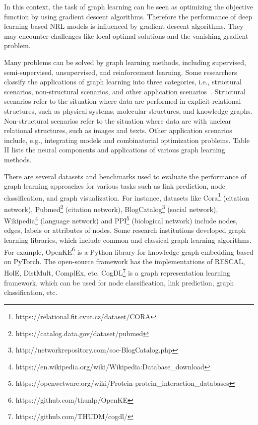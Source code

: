 In this context, the task of graph learning can be seen as optimizing the objective function by using gradient descent algorithms. Therefore the performance of deep learning based NRL models is influenced by gradient descent algorithms. They may encounter challenges like local optimal solutions and the vanishing gradient problem.

\label{sec:appication}
Many problems can be solved by graph learning methods, including supervised, semi-supervised, unsupervised, and reinforcement learning. Some researchers classify the applications of graph learning into three categories, i.e., structural scenarios, non-structural scenarios, and other application scenarios~. Structural scenarios refer to the situation where data are performed in explicit relational structures, such as physical systems, molecular structures, and knowledge graphs. Non-structural scenarios refer to the situation where data are with unclear relational structures, such as images and texts. Other application scenarios include, e.g., integrating models and combinatorial optimization problems. Table II lists the neural components and applications of various graph learning methods.

There are several datasets and benchmarks used to evaluate the performance of graph learning approaches for various tasks such as link prediction, node classification, and graph visualization. For instance, datasets like Cora\footnote{https://relational.fit.cvut.cz/dataset/CORA} (citation network), Pubmed\footnote{https://catalog.data.gov/dataset/pubmed} (citation network), BlogCatalog\footnote{http://networkrepository.com/soc-BlogCatalog.php} (social network), Wikipedia\footnote{https://en.wikipedia.org/wiki/Wikipedia:Database\_download} (language network) and PPI\footnote{https://openwetware.org/wiki/Protein-protein\_interaction\_databases} (biological network) include nodes, edges, labels or attributes of nodes. Some research institutions developed graph learning libraries, which include common and classical graph learning algorithms. For example, OpenKE\footnote{https://github.com/thunlp/OpenKE} is a Python library for knowledge graph embedding based on PyTorch. The open-source framework has the implementations of RESCAL, HolE, DistMult, ComplEx, etc. CogDL\footnote{https://github.com/THUDM/cogdl/} is a graph representation learning framework, which can be used for node classification, link prediction, graph classification, etc.

